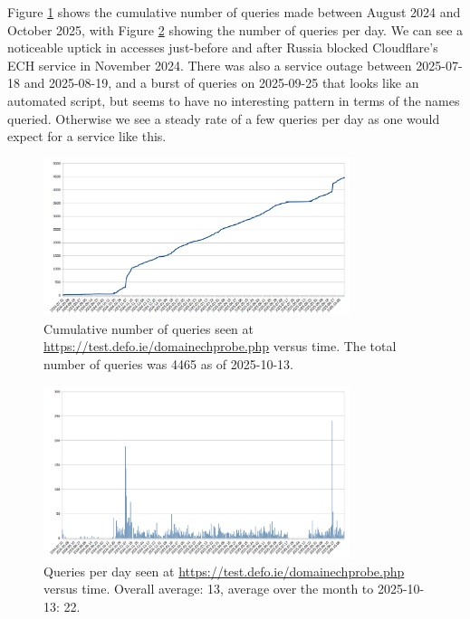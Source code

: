 Figure \ref{fig:qtimes2} shows the cumulative number of queries made between
August 2024 and October 2025, with Figure \ref{fig:cpd} showing the number of queries
per day.  We can see a noticeable uptick in accesses just-before and after
Russia blocked Cloudflare's ECH service in November 2024.  There was also a
service outage between 2025-07-18 and 2025-08-19, and a burst of queries on
2025-09-25 that looks like an automated script, but seems to have no
interesting pattern in terms of the names queried. Otherwise we see a steady
rate of a few queries per day as one would expect for a service like this.

\begin{figure}
	\centering
	\includegraphics[width=0.8\textwidth,keepaspectratio]{domainprobequeries2.png}
		\caption[clustediag]{Cumulative number of queries seen at 
        \url{https://test.defo.ie/domainechprobe.php} versus time. 
        The total number of queries was 4465 as of 2025-10-13.} 
	\label{fig:qtimes2}
\end{figure}

\begin{figure}
	\centering
	\includegraphics[width=0.8\textwidth,keepaspectratio]{cpd.png}
		\caption[clustediag]{Queries per day seen at 
        \url{https://test.defo.ie/domainechprobe.php} versus time.
             Overall average: 13, average over the month to 2025-10-13: 22.}
	\label{fig:cpd}
\end{figure}

